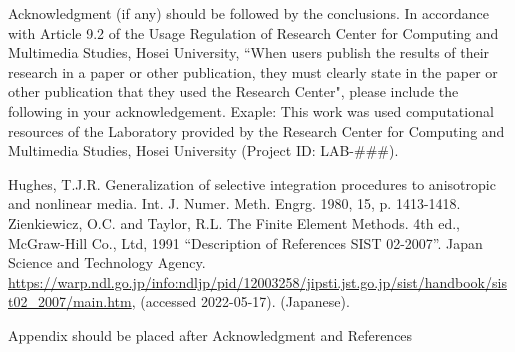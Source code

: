 \documentclass[english]{brccms-hu}
\begin{document}
\Acknowledgement %
Acknowledgment (if any) should be followed by 
the conclusions. In accordance with Article 9.2 of the Usage Regulation of Research Center for Computing and Multimedia Studies, Hosei University, “When users publish the results of their research in a paper or other publication, they must clearly state in the paper or other publication that they used the Research Center", please include the following in your acknowledgement. Exaple: This work was used computational resources of the Laboratory provided by the Research Center for Computing and Multimedia Studies, Hosei University (Project ID: LAB-\#\#\#).
\begin{thebibliography}{9}%
 Hughes, T.J.R. Generalization of selective integration 
procedures to anisotropic and nonlinear media. Int. J. 
Numer. Meth. Engrg. 1980, 15, p. 1413-1418.
 Zienkiewicz, O.C. and Taylor, R.L. The Finite Element 
Methods. 4th ed., McGraw-Hill Co., Ltd, 1991
  “Description of References SIST 02-2007”. Japan Science and Technology Agency. \url{https://warp.ndl.go.jp/info:ndljp/pid/12003258/jipsti.jst.go.jp/sist/handbook/sist02_2007/main.htm}, (accessed 2022-05-17). (Japanese).
\end{thebibliography}

\appendix
Appendix should be placed after Acknowledgment 
and References
\end{document}
